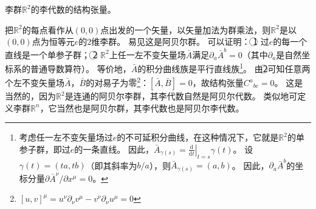 \begin{example}
    李群$\mathbb{R}^2$的李代数的结构张量。

    把$\mathbb{R}^2$的每点看作从$(0, 0)$点出发的一个矢量，以矢量加法为群乘法，则$\mathbb{R}^2$是以$(0, 0)$点为恒等元$e$的$2$维李群。
    易见这是阿贝尔群。
    可以证明：
    \textcircled{1} 过$e$的每一个直线是一个单参子群；
    \textcircled{2} $\mathbb{R}^2$上任一左不变矢量场$\bar A$满足$\partial_a\bar A^b = 0$（其中$\partial_a$是自然坐标系的普通导数算符）。
    等价地，$\bar A$的积分曲线族是平行直线族\footnote{
        考虑任一左不变矢量场过$e$的不可延积分曲线，在这种情况下，它就是$\mathbb{R}^2$的单参子群，即过$e$的一条直线。
        因此，$\bar A_{\gamma(s)} = \left.\frac{\mathrm{d}}{\mathrm{d}t}\right|_{t = s}\gamma(t)$。
        设$\gamma(t) = (ta, tb)$（即其斜率为$b / a$），则$\bar A_{\gamma(s)} = (a, b)$。
        因此，$\partial_a\bar A^b$的坐标分量$\partial\bar A^\nu / \partial x^\mu = 0$。
    }。
    由\textcircled{2}可知任意两个左不变矢量场$\bar A$，$\bar B$的对易子为零\footnote{
        $[u, v]^\mu = u^\nu\partial_\nu v^\mu - v^\nu\partial_\nu u^\mu = 0$
    }：$[\bar A, \bar B] = 0$，故结构张量$C^a{}_{bc} = 0$。
    这是当然的，因为$\mathbb{R}^2$是连通的阿贝尔李群，其李代数自然是阿贝尔代数。
    类似地可定义李群$\mathbb{R}^n$，它当然也是阿贝尔群，其李代数也是阿贝尔李代数。
\end{example}

